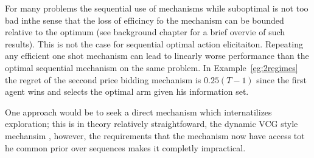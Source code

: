 
For many problems the sequential use of mechanisms while suboptimal is not too bad inthe sense that the loss of efficincy fo the mechanism can be bounded relative to the optimum (see background chapter for a brief overvie of such results).
This is not the case for sequential optimal action elicitaiton. Repeating any efficient one shot mechanism can lead to linearly worse performance than the optimal sequential mechanism on the same problem. In Example~\ref{eg:2regimes} the regret of the  seccond price bidding mechanism is $0.25(T-1)$ since the first agent wins and selects the optimal arm given his information set.










One approach would be to seek a direct mechanism which internatilizes exploration; this is in theory relatively straightfoward, the dynamic VCG style mechansim , however, the requirements that the mechanism now have access tot he common prior over sequences makes it completly impractical.




